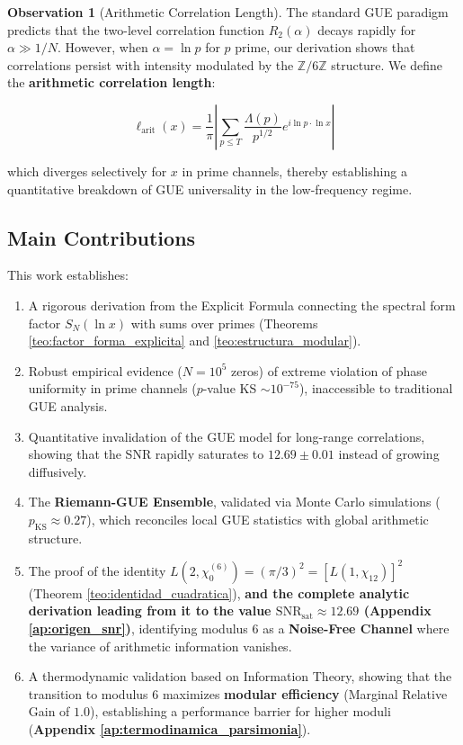 \documentclass[12pt, a4paper]{article}
\theoremstyle{plain}
\theoremstyle{definition}
\newtheorem{observacion}[teorema]{Observation}
\theoremstyle{remark}
\begin{document}
\begin{observacion}[Arithmetic Correlation Length]
The standard GUE paradigm predicts that the two-level correlation function 
$R_2(\alpha)$ decays rapidly for $\alpha \gg 1/N$. However, when 
$\alpha = \ln p$ for $p$ prime, our derivation shows that correlations 
persist with intensity modulated by the $\mathbb{Z}/6\mathbb{Z}$ structure.
We define the \textbf{arithmetic correlation length}:

\[
\ell_{\text{arit}}(x) = \frac{1}{\pi} \left| \sum_{p \leq T} \frac{\Lambda(p)}{p^{1/2}} e^{i\ln p \cdot \ln x} \right|
\]

which diverges selectively for $x$ in prime channels, thereby establishing 
a quantitative breakdown of GUE universality in the low-frequency regime.
\end{observacion}

\subsection{Main Contributions}
\label{subsec:contribuciones}

This work establishes:
\begin{enumerate}[label=(\arabic*)]
\item A rigorous derivation from the Explicit Formula connecting the spectral form factor $S_N(\ln x)$ with sums over primes (Theorems \ref{teo:factor_forma_explicita} and \ref{teo:estructura_modular}).

\item Robust empirical evidence ($N=10^5$ zeros) of extreme violation of phase uniformity in prime channels ($p$-value KS $\sim 10^{-75}$), inaccessible to traditional GUE analysis.

\item Quantitative invalidation of the GUE model for long-range correlations, showing that the SNR rapidly saturates to $12.69 \pm 0.01$ instead of growing diffusively.

\item The \textbf{Riemann-GUE Ensemble}, validated via Monte Carlo simulations ($p_{\text{KS}} \approx 0.27$), which reconciles local GUE statistics with global arithmetic structure.

\item The proof of the identity $L(2,\chi_0^{(6)}) = (\pi/3)^2 = [L(1,\chi_{12})]^2$ (Theorem \ref{teo:identidad_cuadratica}), \textbf{and the complete analytic derivation leading from it to the value $\mathrm{SNR}_{\mathrm{sat}} \approx 12.69$ (Appendix \ref{ap:origen_snr})}, identifying modulus 6 as a \textbf{Noise-Free Channel} where the variance of arithmetic information vanishes.

\item A thermodynamic validation based on Information Theory, showing that the transition to modulus 6 maximizes \textbf{modular efficiency} (Marginal Relative Gain of $1.0$), establishing a performance barrier for higher moduli (\textbf{Appendix \ref{ap:termodinamica_parsimonia}}).
\end{enumerate}
\end{document}
